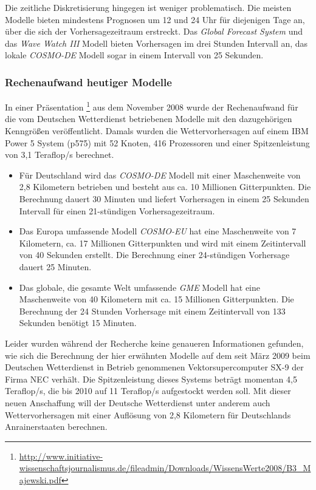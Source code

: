 Die zeitliche Diskretisierung hingegen ist weniger problematisch. Die
meisten Modelle bieten mindestens Prognosen um 12 und 24 Uhr für
diejenigen Tage an, über die sich der Vorhersagezeitraum
erstreckt. Das \textit{Global Forecast System} und das \textit{Wave
  Watch III} Modell bieten Vorhersagen im drei Stunden Intervall an,
das lokale \textit{COSMO-DE} Modell sogar in einem Intervall von 25
Sekunden.

\subsubsection{Rechenaufwand heutiger Modelle}

In einer Präsentation
\footnote{\url{http://www.initiative-wissenschaftsjournalismus.de/fileadmin/Downloads/WissensWerte2008/B3_Majewski.pdf}}
aus dem November 2008 wurde der Rechenaufwand für die vom Deutschen
Wetterdienst betriebenen Modelle mit den dazugehörigen Kenngrößen
veröffentlicht. Damals wurden die Wettervorhersagen auf einem IBM
Power 5 System (p575) mit 52 Knoten, 416 Prozessoren und einer
Spitzenleistung von 3,1 Teraflop/s berechnet.

\begin{itemize}
\item Für Deutschland wird das \textit{COSMO-DE} Modell mit einer
  Maschenweite von 2,8 Kilometern betrieben und besteht aus ca. 10
  Millionen Gitterpunkten. Die Berechnung dauert 30 Minuten und
  liefert Vorhersagen in einem 25 Sekunden Intervall für einen
  21-stündigen Vorhersagezeitraum.
\item Das Europa umfassende Modell \textit{COSMO-EU} hat eine
  Maschenweite von 7 Kilometern, ca. 17 Millionen Gitterpunkten und
  wird mit einem Zeitintervall von 40 Sekunden erstellt. Die
  Berechnung einer 24-stündigen Vorhersage dauert 25 Minuten.
\item Das globale, die gesamte Welt umfassende \textit{GME} Modell hat
  eine Maschenweite von 40 Kilometern mit ca. 15 Millionen
  Gitterpunkten. Die Berechnung der 24 Stunden Vorhersage mit einem
  Zeitintervall von 133 Sekunden benötigt 15 Minuten.
\end{itemize}

Leider wurden während der Recherche keine genaueren Informationen
gefunden, wie sich die Berechnung der hier erwähnten Modelle auf dem
seit März 2009 beim Deutschen Wetterdienst in Betrieb genommenen
Vektorsupercomputer SX-9 der Firma NEC verhält. Die Spitzenleistung
dieses Systems beträgt momentan 4,5 Teraflop/s, die bis 2010 auf 11
Teraflop/s aufgestockt werden soll. Mit dieser neuen Anschaffung will
der Deutsche Wetterdienst unter anderem auch Wettervorhersagen mit
einer Auflösung von 2,8 Kilometern für Deutschlands Anrainerstaaten
berechnen.

